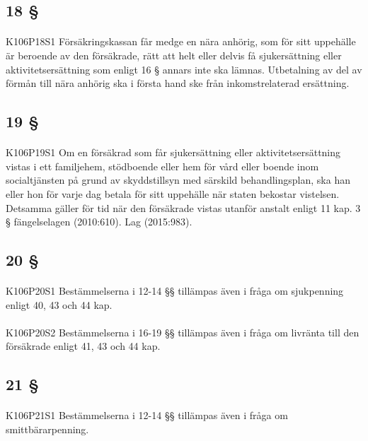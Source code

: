 \documentclass[a4paper,notitlepage,openany,10pt]{book}
\begin{document}
\subsection*{18 §}
\paragraph*{}
{\tiny K106P18S1}
Försäkringskassan får medge en nära anhörig, som för sitt uppehälle är beroende av den försäkrade, rätt att helt eller delvis få sjukersättning eller aktivitetsersättning som enligt 16 § annars inte ska lämnas. Utbetalning av del av förmån till nära anhörig ska i första hand ske från inkomstrelaterad ersättning.
\subsection*{19 §}
\paragraph*{}
{\tiny K106P19S1}
Om en försäkrad som får sjukersättning eller aktivitetsersättning vistas i ett familjehem, stödboende eller hem för vård eller boende inom socialtjänsten på grund av skyddstillsyn med särskild behandlingsplan, ska han eller hon för varje dag betala för sitt uppehälle när staten bekostar vistelsen. Detsamma gäller för tid när den försäkrade vistas utanför anstalt enligt 11 kap. 3 § fängelselagen (2010:610).
Lag (2015:983).
\subsection*{20 §}
\paragraph*{}
{\tiny K106P20S1}
Bestämmelserna i 12-14 §§ tillämpas även i fråga om sjukpenning enligt 40, 43 och 44 kap.
\paragraph*{}
{\tiny K106P20S2}
Bestämmelserna i 16-19 §§ tillämpas även i fråga om livränta till den försäkrade enligt 41, 43 och 44 kap.
\subsection*{21 §}
\paragraph*{}
{\tiny K106P21S1}
Bestämmelserna i 12-14 §§ tillämpas även i fråga om smittbärarpenning.
\end{document}
